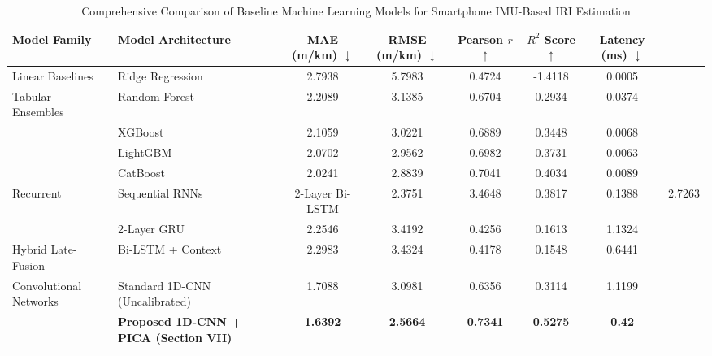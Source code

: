 \begin{table}[t]
\centering
\caption{Comprehensive Comparison of Baseline Machine Learning Models for Smartphone IMU-Based IRI Estimation}
\label{tab:baseline_comparison}
\begin{tabular}{llccccc}
\toprule
\textbf{Model Family} & \textbf{Model Architecture} & \textbf{MAE (m/km)} $\downarrow$ & \textbf{RMSE (m/km)} $\downarrow$ & \textbf{Pearson $r$} $\uparrow$ & \textbf{$R^2$ Score} $\uparrow$ & \textbf{Latency (ms)} $\downarrow$ \\
\midrule
Linear Baselines & Ridge Regression & 2.7938 & 5.7983 & 0.4724 & -1.4118 & 0.0005 \\
Tabular Ensembles & Random Forest & 2.2089 & 3.1385 & 0.6704 & 0.2934 & 0.0374 \\
 & XGBoost & 2.1059 & 3.0221 & 0.6889 & 0.3448 & 0.0068 \\
 & LightGBM & 2.0702 & 2.9562 & 0.6982 & 0.3731 & 0.0063 \\
 & CatBoost & 2.0241 & 2.8839 & 0.7041 & 0.4034 & 0.0089 \\
Recurrent & Sequential RNNs & 2-Layer Bi-LSTM & 2.3751 & 3.4648 & 0.3817 & 0.1388 & 2.7263 \\
 & 2-Layer GRU & 2.2546 & 3.4192 & 0.4256 & 0.1613 & 1.1324 \\
Hybrid Late-Fusion & Bi-LSTM + Context & 2.2983 & 3.4324 & 0.4178 & 0.1548 & 0.6441 \\
Convolutional Networks & Standard 1D-CNN (Uncalibrated) & 1.7088 & 3.0981 & 0.6356 & 0.3114 & 1.1199 \\
\midrule
\textbf{} & \textbf{Proposed 1D-CNN + PICA (Section VII)} & \textbf{1.6392} & \textbf{2.5664} & \textbf{0.7341} & \textbf{0.5275} & \textbf{0.42} \\
\bottomrule
\end{tabular}
\end{table}
